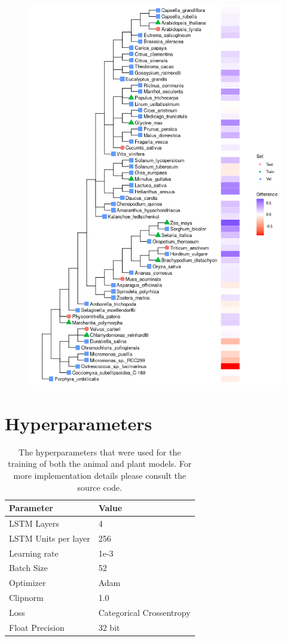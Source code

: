 \documentclass{article}
\begin{document}
\begin{figure}[!h]
\centerline{\includegraphics[width=1.0\textwidth]{images/plants_differences}}
\end{figure}



\clearpage
\section{Hyperparameters}

\begin{table}[!h]
\renewcommand\thetable{S1}
\centering
\begin{tabular}{@{}ll@{}}
\hline
Parameter & Value \\ [0.5ex]
\hline
LSTM Layers & 4 \\
LSTM Units per layer & 256 \\
Learning rate & 1e-3 \\
Batch Size & 52 \\
Optimizer & Adam \\
Clipnorm & 1.0 \\
Loss & Categorical Crossentropy \\
Float Precision & 32 bit \\
\hline
\end{tabular}
\caption{The hyperparameters that were used for the training of both the animal and plant models. For more implementation details please consult the source code.}
\label{suptab:params}
\end{table}
\end{document}
